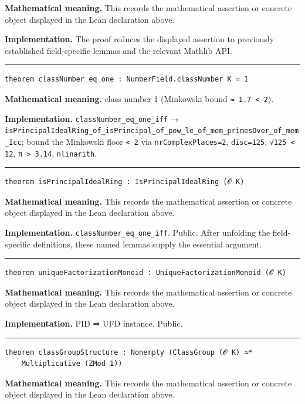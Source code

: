 \documentclass[UTF8,a4paper,11pt,fontset=fandol]{ctexart}
\theoremstyle{definition}
\newcommand{\statementsep}{\par\medskip\hrule\medskip}
\begin{document}
\noindent\textbf{Mathematical meaning.} This records the mathematical assertion or concrete object displayed in the Lean declaration above.\par
\noindent\textbf{Implementation.} The proof reduces the displayed assertion to previously established field-specific lemmas and the relevant Mathlib API.\par
\statementsep
\begin{verbatim}
theorem classNumber_eq_one : NumberField.classNumber K = 1
\end{verbatim}
\noindent\textbf{Mathematical meaning.} class number 1 (Minkowski bound \texttt{≈ 1.\allowbreak{}7 < 2}).\par
\noindent\textbf{Implementation.} \texttt{classNumber\_\allowbreak{}eq\_\allowbreak{}one\_\allowbreak{}iff} → \texttt{isPrincipalIdealRing\_\allowbreak{}of\_\allowbreak{}isPrincipal\_\allowbreak{}of\_\allowbreak{}pow\_\allowbreak{}le\_\allowbreak{}of\_\allowbreak{}mem\_\allowbreak{}primesOver\_\allowbreak{}of\_\allowbreak{}mem\_\allowbreak{}Icc}; bound the Minkowski floor \texttt{< 2} via \texttt{nrComplexPlaces=2}, \texttt{disc=125}, \texttt{√125 < 12}, \texttt{π > 3.\allowbreak{}14}, \texttt{nlinarith}.\par
\statementsep
\begin{verbatim}
theorem isPrincipalIdealRing : IsPrincipalIdealRing (𝓞 K)
\end{verbatim}
\noindent\textbf{Mathematical meaning.} This records the mathematical assertion or concrete object displayed in the Lean declaration above.\par
\noindent\textbf{Implementation.} \texttt{classNumber\_\allowbreak{}eq\_\allowbreak{}one\_\allowbreak{}iff}. Public. After unfolding the field-specific definitions, these named lemmas supply the essential argument.\par
\statementsep
\begin{verbatim}
theorem uniqueFactorizationMonoid : UniqueFactorizationMonoid (𝓞 K)
\end{verbatim}
\noindent\textbf{Mathematical meaning.} This records the mathematical assertion or concrete object displayed in the Lean declaration above.\par
\noindent\textbf{Implementation.} PID ⇒ UFD instance. Public.\par
\statementsep
\begin{verbatim}
theorem classGroupStructure : Nonempty (ClassGroup (𝓞 K) ≃*
    Multiplicative (ZMod 1))
\end{verbatim}
\noindent\textbf{Mathematical meaning.} This records the mathematical assertion or concrete object displayed in the Lean declaration above.\par
\end{document}
